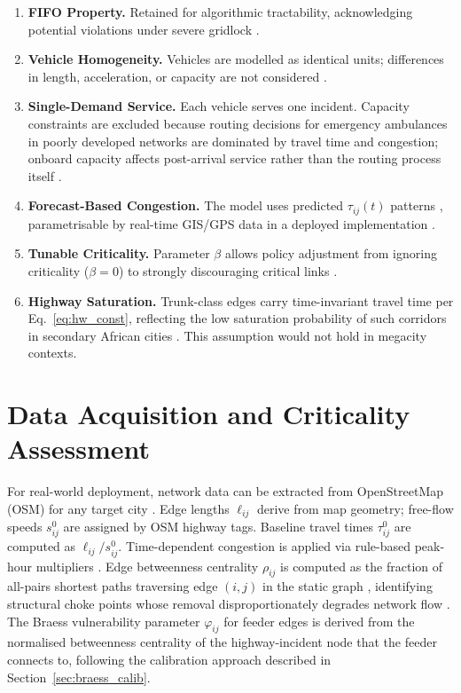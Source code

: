\documentclass[paper=A4, 12pt, mathscr]{report}
\begin{document}
	\begin{enumerate}
		\item \textbf{FIFO Property.} Retained for algorithmic tractability,
		acknowledging potential violations under severe gridlock
		\cite{14,16,humagain}.
		\item \textbf{Vehicle Homogeneity.} Vehicles are modelled as
		identical units; differences in length, acceleration, or capacity
		are not considered \cite{du}.
		\item \textbf{Single-Demand Service.} Each vehicle serves one
		incident. Capacity constraints are excluded because routing
		decisions for emergency ambulances in poorly developed networks are
		dominated by travel time and congestion; onboard capacity affects
		post-arrival service rather than the routing process itself \cite{7}.
		\item \textbf{Forecast-Based Congestion.} The model uses predicted
		$\tau_{ij}(t)$ patterns \cite{13}, parametrisable by real-time
		GIS/GPS data in a deployed implementation \cite{humagain}.
		\item \textbf{Tunable Criticality.} Parameter $\beta$ allows policy
		adjustment from ignoring criticality ($\beta=0$) to strongly
		discouraging critical links \cite{6,11}.
		\item \textbf{Highway Saturation.} Trunk-class edges carry
		time-invariant travel time per Eq.~\eqref{eq:hw_const}, reflecting
		the low saturation probability of such corridors in secondary African
		cities \cite{gonzalez2023}. This assumption would not hold in
		megacity contexts.
	\end{enumerate}
	
	\section{Data Acquisition and Criticality Assessment}
	
	For real-world deployment, network data can be extracted from
	OpenStreetMap (OSM) for any target city \cite{9}. Edge lengths
	$\ell_{ij}$ derive from map geometry; free-flow speeds $s_{ij}^0$ are
	assigned by OSM highway tags. Baseline travel times $\tau_{ij}^0$ are
	computed as $\ell_{ij}/s_{ij}^0$. Time-dependent congestion is applied
	via rule-based peak-hour multipliers \cite{13}. Edge betweenness
	centrality $\rho_{ij}$ is computed as the fraction of all-pairs shortest
	paths traversing edge $(i,j)$ in the static graph \cite{11}, identifying
	structural choke points whose removal disproportionately degrades network
	flow \cite{6,11,hao2024}. The Braess vulnerability parameter
	$\varphi_{ij}$ for feeder edges is derived from the normalised
	betweenness centrality of the highway-incident node that the feeder
	connects to, following the calibration approach described in
	Section~\ref{sec:braess_calib}.
	
\end{document}
